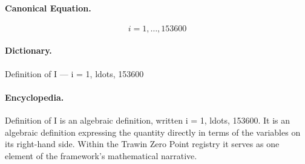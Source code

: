 \paragraph{Canonical Equation.}
\[
i = 1, \ldots, 153600
\]

\paragraph{Dictionary.}
Definition of I — i = 1, ldots, 153600

\paragraph{Encyclopedia.}
Definition of I is an algebraic definition, written i = 1, ldots, 153600. It is an algebraic definition expressing the quantity directly in terms of the variables on its right-hand side. Within the Trawin Zero Point registry it serves as one element of the framework's mathematical narrative.
